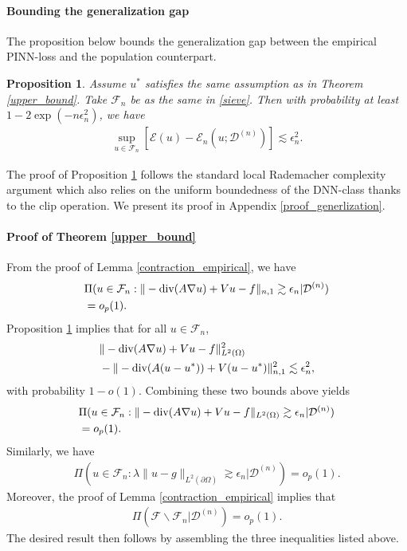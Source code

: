 \documentclass{article}
\newcommand{\F}{\mathcal{F}}
\newcommand{\D}{\mathcal{D}}
\renewcommand{\div}{\textnormal{div}}
\theoremstyle{plain}
\newtheorem{proposition}[theorem]{Proposition}
\theoremstyle{definition}
\theoremstyle{remark}
\begin{document}
\paragraph{Bounding the generalization gap} The proposition below bounds the generalization gap between the empirical PINN-loss and the population counterpart.  

\begin{proposition} \label{generalization}
    Assume $u^*$ satisfies the same assumption as in Theorem \ref{upper_bound}. Take $\F_n$ be as the same in \eqref{sieve}. Then with probability at least $1 - 2\exp(-n\epsilon_n^2)$, we have 
    \begin{align*}
        \sup_{u \in \F_n} \left[\mathcal{E}(u) - \mathcal{E}_n(u; \D^{(n)})\right] \lesssim \epsilon_n^2.
    \end{align*}
\end{proposition}
The proof of Proposition \ref{generalization} follows the standard local Rademacher complexity argument which also relies on the uniform boundedness of the DNN-class thanks to the clip operation.   We  present its proof in Appendix \ref{proof_generlization}.

\paragraph{Proof  of Theorem \ref{upper_bound}}
    From the proof of Lemma \ref{contraction_empirical}, we have
    \begin{align*}
        & \Pi(u \in \F_n: \|-\div (A \nabla u) + Vu -f \|_{n, 1} \gtrsim  \epsilon_n | \D^{(n)} ) \\ &  = o_p(1). 
    \end{align*}
    Proposition \ref{generalization} implies that for all $u \in \F_n$, 
    \begin{align*}
        & \|-\div (A \nabla u) + V u -f \|_{L^2(\Omega)}^2  \\& - \|-\div (A (u - u^*)) + V(u - u^*) \|_{n, 1}^2   \lesssim \epsilon_n^2,
    \end{align*}
    with probability $1 - o(1)$. Combining these two bounds above yields 
    \begin{align*}
        & \Pi(u \in \F_n: \|-\div (A  \nabla u) + V u -f \|_{L^2(\Omega)} \gtrsim  \epsilon_n| \D^{(n)}) \\ & = o_p(1). 
    \end{align*}
    Similarly, we have
    \begin{align*}
        \Pi(u \in \F_n: \lambda \|u -g\|_{L^2(\partial \Omega)} \gtrsim \epsilon_n | \D^{(n)}) = o_p(1). 
    \end{align*}
    Moreover, the proof of Lemma \ref{contraction_empirical} implies that
    \begin{align*}
        \Pi(\F \backslash \F_n | \D^{(n)}) = o_p(1).
    \end{align*}
    The desired result then follows by assembling the three inequalities listed above. 
\end{document}
